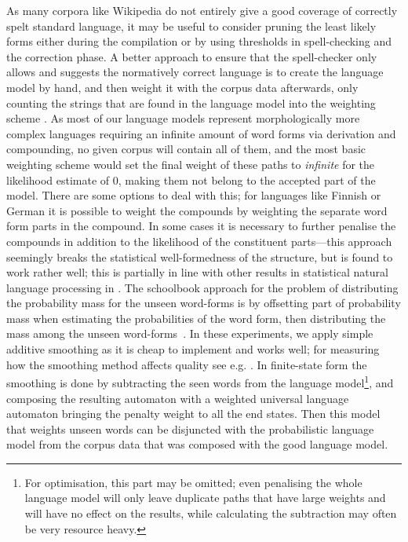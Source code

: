 \documentclass[a4paper,12pt]{article}
\begin{document}
As many corpora like Wikipedia do not entirely give a good coverage of
correctly spelt standard language, it may be useful to consider pruning the
least likely forms either during the compilation or by using thresholds in
spell-checking and the correction phase. A better approach to ensure that the
spell-checker only allows and suggests the normatively correct language is to create
the language model by hand, and then weight it with the corpus data afterwards,
only counting the strings that are found in the language model into the
weighting scheme \cite[]{pirinen/2009/nodalida}. As most of our language
models represent morphologically more complex languages requiring an infinite
amount of word forms via derivation and compounding, no given corpus will
contain all of them, and the most basic weighting scheme would set the final
weight of these paths to \emph{infinite} for the likelihood estimate of 0,
making them not belong to the accepted part of the model. There are some
options to deal with this; for languages like Finnish or German
\cite[]{schiller2006german} it is possible to weight the compounds by weighting
the separate word form parts in the compound. In some cases it is necessary to
further penalise the compounds in addition to the likelihood of the constituent
parts---this approach seemingly breaks the statistical well-formedness of the
structure, but is found to work rather well; this is partially in line with
other results in statistical natural language processing in
\cite{brants2007large}. The schoolbook approach for the problem of distributing
the probability mass for the unseen word-forms is by offsetting part of
probability mass when estimating the probabilities of the word form, then
distributing the mass among the unseen word-forms~\cite[for a good introduction
to smoothing models we refer to][]{jurafsky2000speech}. In these experiments, we
apply simple additive smoothing as it is cheap to implement and works well; for measuring how the smoothing method affects quality see e.g.
\cite{chen1999empirical}. In finite-state form the smoothing is done by
subtracting the seen words from the language model\footnote{For optimisation,
    this part may be omitted; even penalising the whole language model will
    only leave duplicate paths that have large weights and will have no effect
on the results, while calculating the subtraction may often be very resource
heavy.}, and composing the resulting automaton with a weighted universal
language automaton bringing the penalty weight to all the end states. Then
this model that weights unseen words can be disjuncted with the probabilistic
language model from the corpus data that was composed with the good language
model.
\end{document}

